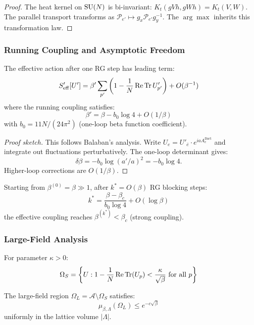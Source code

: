 \begin{proof}
The heat kernel on $\mathrm{SU}(N)$ is bi-invariant: $K_t(gVh, gWh) = K_t(V, W)$. 
The parallel transport transforms as $\mathcal{P}_{e'} \mapsto g_x \mathcal{P}_{e'} g_y^{-1}$. 
The $\arg\max$ inherits this transformation law.
\end{proof}

\subsubsection{Running Coupling and Asymptotic Freedom}

\begin{theorem}
\label{thm:running-coupling}
The effective action after one RG step has leading term:
\[
S'_{\mathrm{eff}}[U'] = \beta' \sum_{p'} \left(1 - \frac{1}{N}\operatorname{Re}\operatorname{Tr} U'_{p'}\right) + O(\beta^{-1})
\]
where the running coupling satisfies:
\[
\beta' = \beta - b_0 \log 4 + O(1/\beta)
\]
with $b_0 = 11N/(24\pi^2)$ (one-loop beta function coefficient).
\end{theorem}

\begin{proof}[Proof sketch]
This follows Balaban's analysis. Write $U_e = U'_{\bar{e}} \cdot e^{iaA^{\text{fluct}}_e}$ 
and integrate out fluctuations perturbatively. The one-loop determinant gives:
\[
\delta\beta = -b_0 \log(a'/a)^2 = -b_0 \log 4.
\]
Higher-loop corrections are $O(1/\beta)$.
\end{proof}

\begin{corollary}
\label{cor:crossover-scale}
Starting from $\beta^{(0)} = \beta \gg 1$, after $k^* = O(\beta)$ RG blocking steps:
\[
k^* = \frac{\beta - \beta_c}{b_0 \log 4} + O(\log\beta)
\]
the effective coupling reaches $\beta^{(k^*)} < \beta_c$ (strong coupling).
\end{corollary}

\subsubsection{Large-Field Analysis}

\begin{definition}
\label{def:small-field}
For parameter $\kappa > 0$:
\[
\Omega_S = \left\{U : 1 - \frac{1}{N}\operatorname{Re}\operatorname{Tr}(U_p) < \frac{\kappa}{\sqrt{\beta}} \text{ for all } p\right\}
\]
\end{definition}

\begin{theorem}
\label{thm:large-field}
The large-field region $\Omega_L = \mathcal{A} \setminus \Omega_S$ satisfies:
\[
\mu_{\beta,\Lambda}(\Omega_L) \leq e^{-c\sqrt{\beta}}
\]
uniformly in the lattice volume $|\Lambda|$.
\end{theorem}

